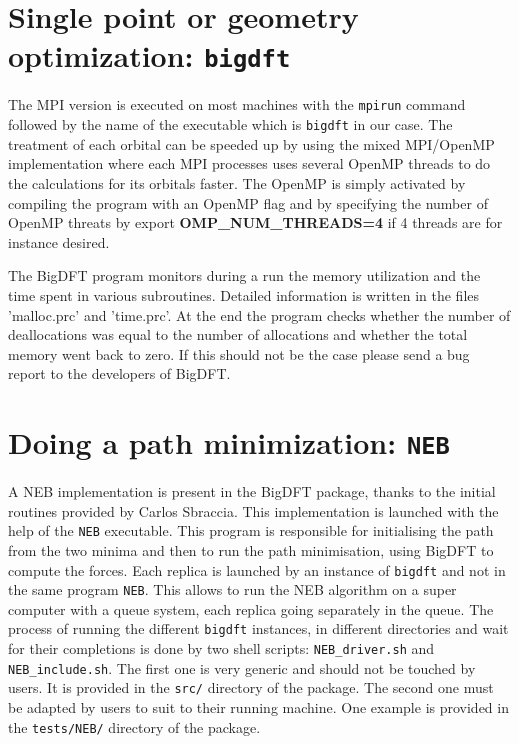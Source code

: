\documentclass[a4paper,11pt]{report}
\begin{document}
\section{Single point or geometry optimization: \texttt{bigdft}}
The MPI version is executed on most machines with the \texttt{mpirun} command followed by the name of the executable which is 
\texttt{bigdft} in our case.
The treatment of each orbital can be speeded up by using the mixed MPI/OpenMP implementation 
where each MPI processes uses several OpenMP threads to do the calculations for its orbitals faster. 
The OpenMP is simply activated by compiling the program with an OpenMP flag and by specifying the number of OpenMP threats by
export \textbf{OMP\_NUM\_THREADS=4} if 4 threads are for instance desired.

\noindent
The BigDFT program monitors during a run the memory utilization and the time spent in various subroutines. Detailed information 
is written in the files 'malloc.prc' and 'time.prc'. At the end the program checks whether the number of deallocations was equal 
to the number of allocations and whether the total memory went back to zero. If this should not be the case please send a bug report to the developers of BigDFT.

\section{Doing a path minimization: \texttt{NEB}}
A NEB implementation is present in the BigDFT package, thanks to the initial routines provided by Carlos Sbraccia. This implementation is launched with the help of the \texttt{NEB} executable. This program is responsible for initialising the path from the two minima and then to run the path minimisation, using BigDFT to compute the forces. Each replica is launched by an instance of \texttt{bigdft} and not in the same program \texttt{NEB}. This allows to run the NEB algorithm on a super computer with a queue system, each replica going separately in the queue. 
The process of running the different \texttt{bigdft} instances, in different directories and wait for their completions is done by two shell scripts: \texttt{NEB\_driver.sh} and \texttt{NEB\_include.sh}. The first one is very generic and should not be touched by users. It is provided in the \texttt{src/} directory of the package. The second one must be adapted by users to suit to their running machine. One example is provided in the \texttt{tests/NEB/} directory of the package.
\end{document}
